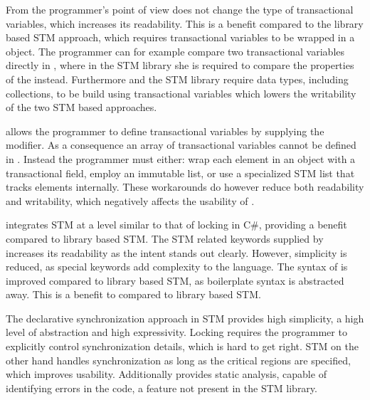 From the programmer's point of view \stmname does not change the type of transactional variables, which increases its readability. This is a benefit compared to the library based \ac{STM} approach, which requires transactional variables to be wrapped in a  object. The programmer can for example compare two transactional variables directly in \stmname, where in the \ac{STM} library she is required to compare the  properties of the  instead. Furthermore \stmname and the \ac{STM} library require data types, including collections, to be build using transactional variables which lowers the writability of the two \ac{STM} based approaches.  %

\stmname allows the programmer to define transactional variables by supplying the  modifier. As a consequence an array of transactional variables cannot be defined in \stmname. Instead the programmer must either: wrap each element in an object with a transactional field, employ an immutable list, or use a specialized \ac{STM} list that tracks elements internally. These workarounds do however reduce both readability and writability, which negatively affects the usability of \stmname.

\stmname integrates \ac{STM} at a level similar to that of locking in C\#, providing a benefit compared to library based \ac{STM}. The \ac{STM} related keywords supplied by \stmname increases its readability as the intent stands out clearly. However, simplicity is  reduced, as special keywords add complexity to the language. The syntax of \stmname is improved compared to library based \ac{STM}, as boilerplate syntax is abstracted away. This is a benefit to \stmname compared to library based \ac{STM}. 

The declarative synchronization approach in \ac{STM} provides high simplicity, a high level of abstraction and high expressivity. Locking requires the programmer to explicitly control synchronization details, which is hard to get right. \ac{STM} on the other hand handles synchronization as long as the critical regions are specified, which improves usability. Additionally \stmname provides static analysis, capable of identifying errors in the code, a feature not present in the \ac{STM} library. 

